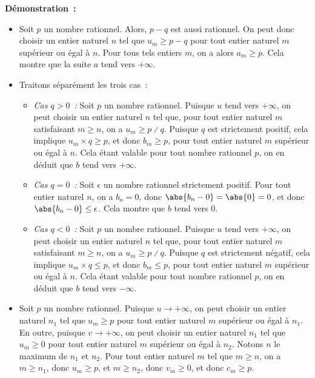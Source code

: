 \noindent\textbf{Démonstration :} 
\begin{itemize}[nosep]
    \item Soit $p$ un nombre rationnel.
        Alors, $p - q$ est aussi rationnel.
        On peut donc choisir un entier naturel $n$ tel que $u_m \geq p - q$ pour tout entier naturel $m$ supérieur ou égal à $n$. 
        Pour tous tels entiers $m$, on a alors $a_m \geq p$.
        Cela montre que la suite $a$ tend vers $+\infty$.
    \item Traitons séparément les trois cas : 
        \begin{itemize}[nosep]
            \item \emph{Cas $q > 0$ :} Soit $p$ un nombre rationnel.
                Puisque $u$ tend vers $+\infty$, on peut choisir un entier naturel $n$ tel que, pour tout entier naturel $m$ satisfaisant $m \geq n$, on a $u_m \geq p \divslash q$.
                Puisque $q$ est strictement positif, cela implique $u_m \times q \geq p$, et donc $b_m \geq p$, pour tout entier naturel $m$ supérieur ou égal à $n$.
                Cela étant valable pour tout nombre rationnel $p$, on en déduit que $b$ tend vers $+\infty$.
            \item \emph{Cas $q = 0$ :} Soit $\epsilon$ un nombre rationnel strictement positif. Pour tout entier naturel $n$, on a $b_n = 0$, donc $\abs{b_n - 0} = \abs{0} = 0$, et donc $\abs{b_n - 0} \leq \epsilon$.
                Cela montre que $b$ tend vers $0$.
            \item \emph{Cas $q < 0$ :} Soit $p$ un nombre rationnel.
                Puisque $u$ tend vers $+\infty$, on peut choisir un entier naturel $n$ tel que, pour tout entier naturel $m$ satisfaisant $m \geq n$, on a $u_m \geq p \divslash q$.
                Puisque $q$ est strictement négatif, cela implique $u_m \times q \leq p$, et donc $b_m \leq p$, pour tout entier naturel $m$ supérieur ou égal à $n$.
                Cela étant valable pour tout nombre rationnel $p$, on en déduit que $b$ tend vers $-\infty$.
        \end{itemize}
    \item Soit $p$ un nombre rationnel.
        Puisque $u \rightarrow +\infty$, on peut choisir un entier naturel $n_1$ tel que $u_m \geq p$ pour tout entier naturel $m$ supérieur ou égal à $n_1$.
        En outre, puisque $v \rightarrow +\infty$, on peut choisir un entier naturel $n_1$ tel que $u_m \geq 0$ pour tout entier naturel $m$ supérieur ou égal à $n_2$.
        Notons $n$ le maximum de $n_1$ et $n_2$.
        Pour tout entier naturel $m$ tel que $m \geq n$, on a $m \geq n_1$, donc $u_m \geq p$, et $m \geq n_2$, donc $v_m \geq 0$, et donc $c_m \geq p$.

\end{itemize}
